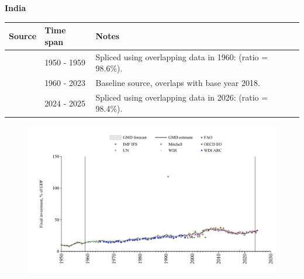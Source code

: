 \documentclass[12pt,a4paper,landscape]{article}
\begin{document}
\begin{adjustbox}{max totalsize={\paperwidth}{\paperheight},center}
\begin{minipage}[t][\textheight][t]{\textwidth}
\vspace*{0.5cm}
{}
\begin{center}
{\Large\bfseries India}
\end{center}
\vspace{0.5cm}
\begin{table}[H]
\centering
\small
\begin{tabular}{|l|l|l|}
\hline
\textbf{Source} & \textbf{Time span} & \textbf{Notes} \\
\hline
\rowcolor{white}\cite{Mitchell}& 1950 - 1959 &Spliced using overlapping data in 1960: (ratio = 98.6\%).\\
\rowcolor{lightgray}\cite{WDI}& 1960 - 2023 &Baseline source, overlaps with base year 2018.\\
\rowcolor{white}\cite{OECD_EO}& 2024 - 2025 &Spliced using overlapping data in 2026: (ratio = 98.4\%).\\
\hline
\end{tabular}
\end{table}
\begin{figure}[H]
\centering
\includegraphics[width=\textwidth,height=0.6\textheight,keepaspectratio]{graphs/IND_finv_GDP.pdf}
\end{figure}
\end{minipage}
\end{adjustbox}
\end{document}

